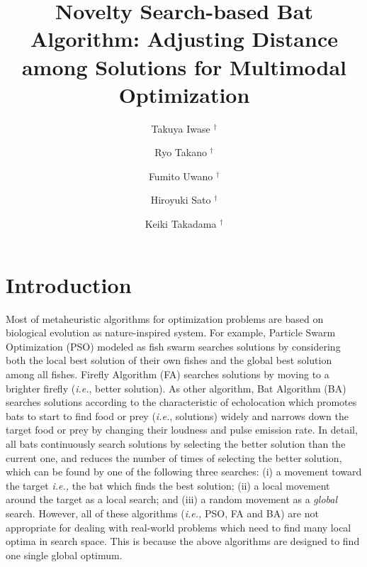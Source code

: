 \documentclass{ies2018}
\title{Novelty Search-based Bat Algorithm: Adjusting Distance among Solutions for Multimodal Optimization}
\author{Takuya Iwase $^{\dagger}$ \and Ryo Takano $^{\dagger}$ \and Fumito Uwano $^{\dagger}$ \and Hiroyuki Sato $^{\dagger}$ \and Keiki Takadama $^{\dagger}$}
\affiliation{%
    ${}^\dagger$ The University of Electro-Communications, Tokyo, Japan\\
}
\begin{document}
\maketitle

\section{Introduction}

Most of metaheuristic algorithms for optimization problems are based on biological evolution as nature-inspired system. For example, Particle Swarm Optimization (PSO) \cite{PSO01} modeled as fish swarm searches solutions by considering both the local best solution of their own fishes and the global best solution among all fishes. Firefly Algorithm (FA) \cite{FA01} searches solutions by moving to a brighter firefly (\textit{i.e.}, better solution). As other algorithm, Bat Algorithm (BA) \cite{BA01} searches solutions according to the characteristic of echolocation which promotes bats to start to find food or prey (\textit{i.e.}, solutions) widely and narrows down the target food or prey by changing their loudness and pulse emission rate. In detail, all bats continuously search solutions by selecting the better solution than the current one, and reduces the number of times of selecting the better solution, which can be found by one of the following three searches: (i) a movement toward the target \textit{i.e.,} the bat which finds the best solution; (ii) a local movement around the target as a local search; and (iii) a random movement as a \textit{global} search. However, all of these algorithms (\textit{i.e.,} PSO, FA and BA) are not appropriate for dealing with real-world problems which need to find many local optima in search space. This is because the above algorithms are designed to find one single global optimum. 
\end{document}
